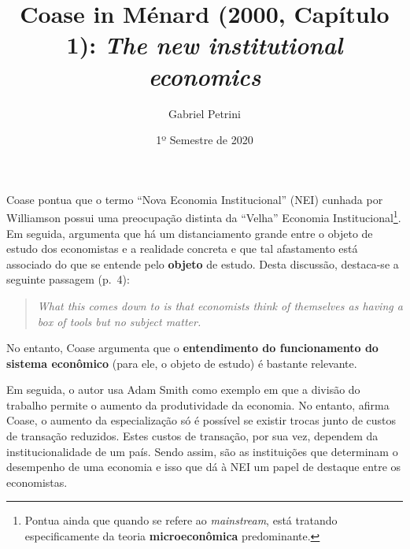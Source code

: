 \documentclass[9pt,twocolumn,twoside,lineno]{style}
\title{Coase  in Ménard (2000, Capítulo 1): \textit{The new institutional economics}}
\date{1º Semestre de  2020}
\author[$\ddagger$]{Gabriel Petrini}
\affil[$\ddagger$]{Doutorando no instituto de Economia da Unicamp}
\begin{document}
\maketitle\articletypemark
\marginmark
\thispagestyle{firststyle}


	
Coase pontua que o termo ``Nova Economia Institucional'' (NEI) cunhada por Williamson possui uma preocupação distinta da ``Velha'' Economia Institucional\footnote{Pontua ainda que quando se refere ao \textit{mainstream}, está tratando especificamente da teoria \textbf{microeconômica} predominante.}. Em seguida, argumenta que há um distanciamento grande entre o objeto de estudo dos economistas e a realidade concreta e que tal afastamento está associado do que se entende pelo \textbf{objeto} de estudo. Desta discussão, destaca-se a seguinte passagem (p.~4):

\begin{quote}
	\textit{What this comes down to is that economists think of themselves as having a box of tools but no subject matter.}
\end{quote}
No entanto, Coase argumenta que o \textbf{entendimento do funcionamento do sistema econômico} (para ele, o objeto de estudo) é bastante relevante.

Em seguida, o autor usa Adam Smith como exemplo em que a divisão do trabalho permite o aumento da produtividade da economia. No entanto, afirma Coase, o aumento da especialização só é possível se existir trocas junto de custos de transação reduzidos. Estes custos de transação, por sua vez, dependem da institucionalidade de um país. Sendo assim, são as instituições que determinam o desempenho de uma economia e isso que dá à NEI um papel de destaque entre os economistas.
\end{document}
